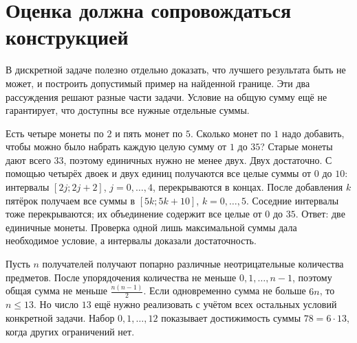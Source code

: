 \section{Оценка должна сопровождаться конструкцией}
В дискретной задаче полезно отдельно доказать, что лучшего результата быть не может, и построить допустимый пример на найденной границе. Эти два рассуждения решают разные части задачи. Условие на общую сумму ещё не гарантирует, что доступны все нужные отдельные суммы.
\begin{example}\label{ex:review-ege-c17-1}
Есть четыре монеты по \(2\) и пять монет по \(5\). Сколько монет по \(1\) надо добавить, чтобы можно было набрать каждую целую сумму от \(1\) до \(35\)? Старые монеты дают всего \(33\), поэтому единичных нужно не менее двух.
Двух достаточно. С помощью четырёх двоек и двух единиц получаются все целые суммы от \(0\) до \(10\): интервалы \([2j;2j+2]\), \(j=0,\ldots,4\), перекрываются в концах. После добавления \(k\) пятёрок получаем все суммы в \([5k;5k+10]\), \(k=0,\ldots,5\). Соседние интервалы тоже перекрываются; их объединение содержит все целые от \(0\) до \(35\). Ответ: две единичные монеты. Проверка одной лишь максимальной суммы дала необходимое условие, а интервалы доказали достаточность.
\end{example}
\begin{example}\label{ex:review-ege-c17-2}
Пусть \(n\) получателей получают попарно различные неотрицательные количества предметов. После упорядочения количества не меньше \(0,1,\ldots,n-1\), поэтому общая сумма не меньше \(\frac{n(n-1)}2\). Если одновременно сумма не больше \(6n\), то \(n\le13\). Но число \(13\) ещё нужно реализовать с учётом всех остальных условий конкретной задачи. Набор \(0,1,\ldots,12\) показывает достижимость суммы \(78=6\cdot13\), когда других ограничений нет.
\end{example}

